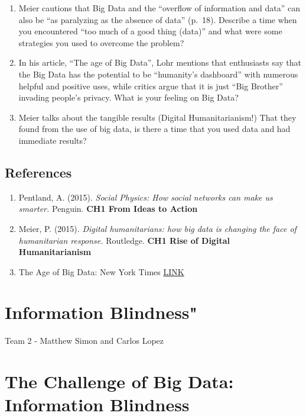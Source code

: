 \documentclass[]{book}
\providecommand{\tightlist}{%
  \setlength{\itemsep}{0pt}\setlength{\parskip}{0pt}}
\theoremstyle{definition}
\theoremstyle{definition}
\theoremstyle{definition}
\theoremstyle{remark}
\begin{document}
\begin{enumerate}
\def\labelenumi{\arabic{enumi}.}
\item
  Meier cautions that Big Data and the ``overflow of information and
  data'' can also be ``as paralyzing as the absence of data'' (p.~18).
  Describe a time when you encountered ``too much of a good thing
  (data)'' and what were some strategies you used to overcome the
  problem?
\item
  In his article, ``The age of Big Data'', Lohr mentions that
  enthusiasts say that the Big Data has the potential to be ``humanity's
  dashboard'' with numerous helpful and positive uses, while critics
  argue that it is just ``Big Brother'' invading people's privacy. What
  is your feeling on Big Data?
\item
  Meier talks about the tangible results (Digital Humanitarianism!) That
  they found from the use of big data, is there a time that you used
  data and had immediate results?
\end{enumerate}

\hypertarget{references}{%
\section{References}\label{references}}

\begin{enumerate}
\def\labelenumi{\arabic{enumi}.}
\tightlist
\item
  Pentland, A. (2015). \emph{Social Physics: How social networks can
  make us smarter.} Penguin. \textbf{CH1 From Ideas to Action}
\item
  Meier, P. (2015). \emph{Digital humanitarians: how big data is
  changing the face of humanitarian response.} Routledge. \textbf{CH1
  Rise of Digital Humanitarianism}
\item
  The Age of Big Data: New York Times
  \href{https://www.nytimes.com/2012/02/12/sunday-review/big-datas-impact-in-the-world.html}{LINK}
\end{enumerate}

\hypertarget{information-blindness}{%
\chapter{Information Blindness"}\label{information-blindness}}

Team 2 - Matthew Simon and Carlos Lopez

\hypertarget{the-challenge-of-big-data-information-blindness}{%
\chapter{The Challenge of Big Data: Information
Blindness}\label{the-challenge-of-big-data-information-blindness}}
\end{document}
